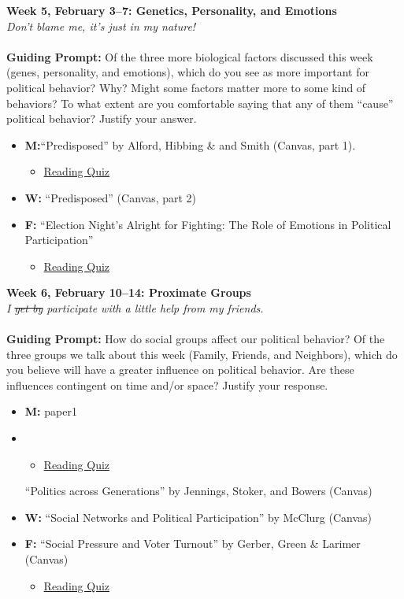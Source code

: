 \documentclass[11pt]{article}
\def\doubleq#1{``#1''}
\begin{document}
\textbf{Week 5, February 3--7: Genetics, Personality, and Emotions}
\\
\textit{Don't blame me, it's just in my nature!}
\\\\
\textbf{Guiding Prompt:} Of the three more biological factors discussed this week (genes, personality, and emotions), which do you see as more important for political behavior? Why? Might some factors matter more to some kind of behaviors? To what extent are you comfortable saying that any of them ``cause'' political behavior? Justify your answer. 
\begin{itemize}
\item \textbf{M:}\doubleq{Predisposed} by Alford, Hibbing \& and Smith (Canvas, part 1).
\begin{itemize}
\item\underline{Reading Quiz}
\end{itemize}
\item \textbf{W:} \doubleq{Predisposed} (Canvas, part 2)
\item \textbf{F:} \doubleq{Election Night's Alright for Fighting: The Role of Emotions in Political Participation}
\begin{itemize}
\item\underline{Reading Quiz}
\end{itemize}
\end{itemize}

\textbf{Week 6, February 10--14: Proximate Groups}
\\
\textit{I \sout{get by} participate with a little help from my friends.}
\\\\
\textbf{Guiding Prompt:} How do social groups affect our political behavior? Of the three groups we talk about this week (Family, Friends, and Neighbors), which do you believe will have a greater influence on political behavior. Are these influences contingent on time and/or space?  Justify your response.
\begin{itemize}
\item \textbf{M:} paper1
\item \begin{itemize}
\item\underline{Reading Quiz}
\end{itemize} \doubleq{Politics across Generations} by Jennings, Stoker, and Bowers (Canvas)
\item \textbf{W:} \doubleq{Social Networks and Political Participation} by McClurg (Canvas)
\item \textbf{F:} \doubleq{Social Pressure and Voter Turnout} by Gerber, Green \& Larimer (Canvas)
\begin{itemize}
\item\underline{Reading Quiz}
\end{itemize}
\end{itemize}
\end{document}
